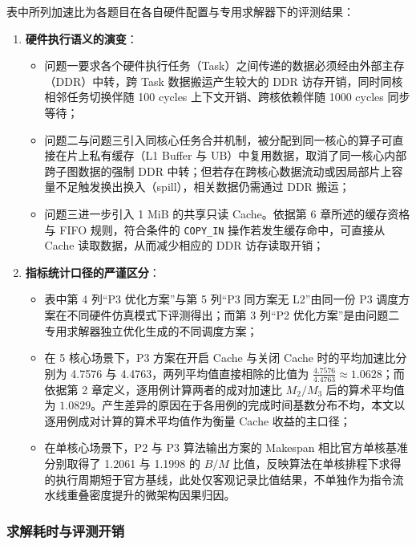 \documentclass[anonymous,withtoc]{gmcm2026}
\providecommand{\tightlist}{\setlength{\itemsep}{0pt}\setlength{\parskip}{0pt}}
\begin{document}
表中所列加速比为各题目在各自硬件配置与专用求解器下的评测结果：

\begin{enumerate}
\def\labelenumi{\arabic{enumi}.}
\tightlist
\item
  \textbf{硬件执行语义的演变}：

  \begin{itemize}
  \tightlist
  \item
    问题一要求各个硬件执行任务（Task）之间传递的数据必须经由外部主存（DDR）中转，跨 Task 数据搬运产生较大的 DDR 访存开销，同时同核相邻任务切换伴随 100 cycles 上下文开销、跨核依赖伴随 1000 cycles 同步等待；
  \item
    问题二与问题三引入同核心任务合并机制，被分配到同一核心的算子可直接在片上私有缓存（L1 Buffer 与 UB）中复用数据，取消了同一核心内部跨子图数据的强制 DDR 中转；但若存在跨核心数据流动或因局部片上容量不足触发换出换入（spill），相关数据仍需通过 DDR 搬运；
  \item
    问题三进一步引入 1 MiB 的共享只读 Cache。依据第 6 章所述的缓存资格与 FIFO 规则，符合条件的 \texttt{COPY\_IN} 操作若发生缓存命中，可直接从 Cache 读取数据，从而减少相应的 DDR 访存读取开销；
  \end{itemize}
\item
  \textbf{指标统计口径的严谨区分}：

  \begin{itemize}
  \tightlist
  \item
    表中第 4 列``P3 优化方案''与第 5 列``P3 同方案无 L2''由同一份 P3 调度方案在不同硬件仿真模式下评测得出；而第 3 列``P2 优化方案''是由问题二专用求解器独立优化生成的不同调度方案；
  \item
    在 5 核心场景下，P3 方案在开启 Cache 与关闭 Cache 时的平均加速比分别为 4.7576 与 4.4763，两列平均值直接相除的比值为 \(\frac{4.7576}{4.4763} \approx 1.0628\)；而依据第 2 章定义，逐用例计算两者的成对加速比 \(M_2/M_3\) 后的算术平均值为 \(1.0829\)。产生差异的原因在于各用例的完成时间基数分布不均，本文以逐用例成对计算的算术平均值作为衡量 Cache 收益的主口径；
  \item
    在单核心场景下，P2 与 P3 算法输出方案的 Makespan 相比官方单核基准分别取得了 1.2061 与 1.1998 的 \(B/M\) 比值，反映算法在单核排程下求得的执行周期短于官方基线，此处仅客观记录比值结果，不单独作为指令流水线重叠密度提升的微架构因果归因。
  \end{itemize}
\end{enumerate}

\subsubsection{求解耗时与评测开销}
\end{document}
